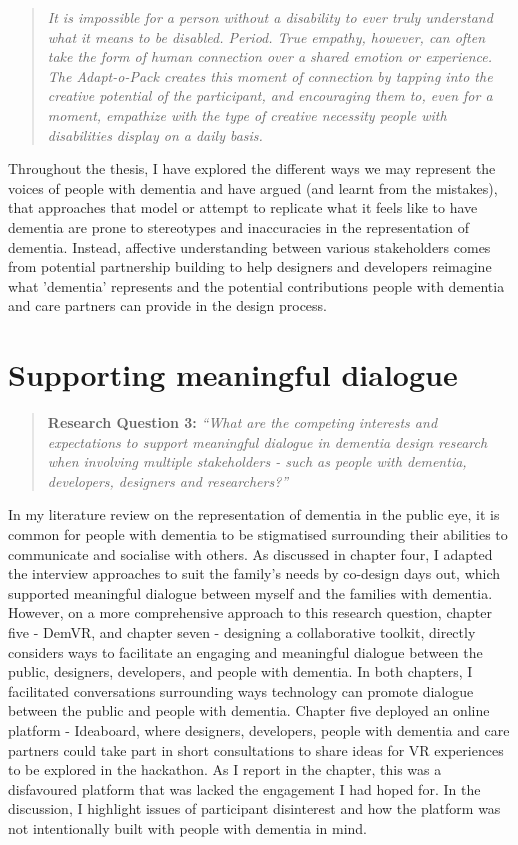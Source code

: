 \begin{quote}
\textit{
It is impossible for a person without a disability to ever truly understand what it means to be disabled. Period. True empathy, however, can often take the form of human connection over a shared emotion or experience. The Adapt-o-Pack creates this moment of connection by tapping into the creative potential of the participant, and encouraging them to, even for a moment, empathize with the type of creative necessity people with disabilities display on a daily basis.
}
\end{quote}

Throughout the thesis, I have explored the different ways we may represent the voices of people with dementia and have argued (and learnt from the mistakes), that approaches that model or attempt to replicate what it feels like to have dementia are prone to stereotypes and inaccuracies in the representation of dementia. Instead, affective understanding between various stakeholders comes from potential partnership building to help designers and developers reimagine what 'dementia' represents and the potential contributions people with dementia and care partners can provide in the design process. 


\section{Supporting meaningful dialogue}
\label{Discussion:RQ3}
\begin{quote}
\textbf{    Research Question 3:
}    
\textit{ “What are the competing interests and expectations to support meaningful dialogue in dementia design research when involving multiple stakeholders - such as people with dementia, developers, designers and researchers?”}
\end{quote}
In my literature review on the representation of dementia in the public eye, it is common for people with dementia to be stigmatised surrounding their abilities to communicate and socialise with others. As discussed in chapter four, I adapted the interview approaches to suit the family's needs by co-design days out, which supported meaningful dialogue between myself and the families with dementia. However, on a more comprehensive approach to this research question, chapter five - DemVR, and chapter seven - designing a collaborative toolkit, directly considers ways to facilitate an engaging and meaningful dialogue between the public, designers, developers, and people with dementia. In both chapters, I facilitated conversations surrounding ways technology can promote dialogue between the public and people with dementia. Chapter five deployed an online platform - Ideaboard, where designers, developers, people with dementia and care partners could take part in short consultations to share ideas for VR experiences to be explored in the hackathon. As I report in the chapter, this was a disfavoured platform that was lacked the engagement I had hoped for. In the discussion, I highlight issues of participant disinterest and how the platform was not intentionally built with people with dementia in mind. 


